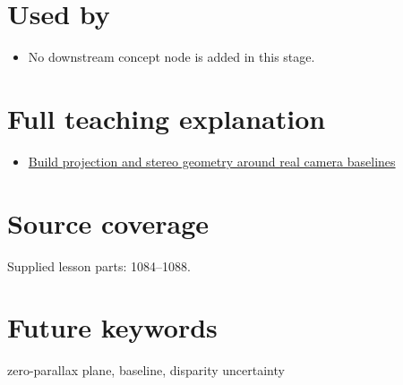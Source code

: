 \section{Used by}\label{appendix-0976e86e5b9f-used-by}

\begin{itemize}
\tightlist
\item
  No downstream concept node is added in this stage.
\end{itemize}

\section{Full teaching explanation}\label{appendix-0976e86e5b9f-full-teaching-explanation}

\begin{itemize}
\tightlist
\item
  \href{Continuous\%20Notes/Computing\%20Foundations\%20-\%20From\%20Bits\%20to\%20C++\%20and\%20Systems\%20APIs\#Build\%20projection\%20and\%20stereo\%20geometry\%20around\%20real\%20camera\%20baselines}{Build projection and stereo geometry around real camera baselines}
\end{itemize}

\section{Source coverage}\label{appendix-0976e86e5b9f-source-coverage}

Supplied lesson parts: 1084--1088.

\section{Future keywords}\label{appendix-0976e86e5b9f-future-keywords}

zero-parallax plane, baseline, disparity uncertainty
